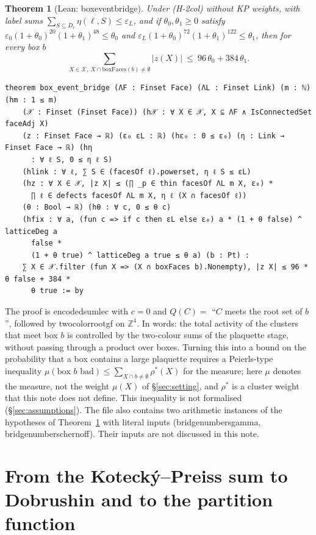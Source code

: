 \documentclass[11pt,a4paper]{article}
\newtheorem{theorem}{Theorem}[section]
\theoremstyle{definition}
\theoremstyle{remark}
\DeclareRobustCommand{\lean}[1]{{\ttfamily\renewcommand{\_}{\textunderscore\allowbreak}#1}}
\newenvironment{leanquote}{\par\smallskip\footnotesize}{\par\smallskip}
\newcommand{\Z}{\mathbb{Z}}
\begin{document}
\begin{theorem}[Lean: \lean{box\_event\_bridge}]\label{thm:bridge}
Under (H-2col) without KP weights, with label sums $\sum_{S\subseteq D_\ell}\eta(\ell,S)\le\varepsilon_L$, and if $\theta_0,\theta_1\ge0$ satisfy $\varepsilon_0(1+\theta_0)^{20}(1+\theta_1)^{48}\le\theta_0$ and $\varepsilon_L(1+\theta_0)^{72}(1+\theta_1)^{122}\le\theta_1$, then for every box $b$
\[
\sum_{X\in\mathcal X,\ X\cap\mathrm{boxFaces}(b)\ne\emptyset}|z(X)|\ \le\ 96\,\theta_0+384\,\theta_1 .
\]
\end{theorem}
\begin{leanquote}
\begin{verbatim}
theorem box_event_bridge (ΛF : Finset Face) (ΛL : Finset Link) (m : ℕ) (hm : 1 ≤ m)
    (𝒳 : Finset (Finset Face)) (h𝒳 : ∀ X ∈ 𝒳, X ⊆ ΛF ∧ IsConnectedSet faceAdj X)
    (z : Finset Face → ℝ) (ε₀ εL : ℝ) (hε₀ : 0 ≤ ε₀) (η : Link → Finset Face → ℝ) (hη
      : ∀ ℓ S, 0 ≤ η ℓ S)
    (hlink : ∀ ℓ, ∑ S ∈ (facesOf ℓ).powerset, η ℓ S ≤ εL)
    (hz : ∀ X ∈ 𝒳, |z X| ≤ (∏ _p ∈ thin facesOf ΛL m X, ε₀) *
      ∏ ℓ ∈ defects facesOf ΛL m X, η ℓ (X ∩ facesOf ℓ))
    (θ : Bool → ℝ) (hθ : ∀ c, 0 ≤ θ c)
    (hfix : ∀ a, (fun c => if c then εL else ε₀) a * (1 + θ false) ^ latticeDeg a
      false *
      (1 + θ true) ^ latticeDeg a true ≤ θ a) (b : Pt) :
    ∑ X ∈ 𝒳.filter (fun X => (X ∩ boxFaces b).Nonempty), |z X| ≤ 96 * θ false + 384 *
      θ true := by
\end{verbatim}
\end{leanquote}
The proof is \lean{encoded\_sum\_le\_c} with $c=0$ and $Q(C)=$ ``$C$ meets the root set of $b$'', followed by \lean{two\_color\_root\_gf} on $\Z^4$. In words: the total activity of the clusters that meet box $b$ is controlled by the two-colour sums of the plaquette stage, without passing through a product over boxes. Turning this into a bound on the probability that a box contains a large plaquette requires a Peierls-type inequality $\mu(\text{box $b$ bad})\le\sum_{X\cap b\ne\emptyset}\rho^*(X)$ for the measure; here $\mu$ denotes the measure, not the weight $\mu(X)$ of \S\ref{sec:setting}, and $\rho^*$ is a cluster weight that this note does not define. This inequality is not formalised (\S\ref{sec:assumptions}). The file also contains two arithmetic instances of the hypotheses of Theorem~\ref{thm:bridge} with literal inputs (\lean{bridge\_numbers\_gamma}, \lean{bridge\_numbers\_chernoff}). Their inputs are not discussed in this note.

\section{From the Kotecký--Preiss sum to Dobrushin and to the partition function}\label{sec:dobrushin}
\end{document}
